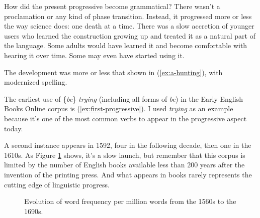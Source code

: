 How did the present progressive become grammatical? There wasn't a proclamation or any kind of phase transition. Instead, it progressed more or less the way science does: one death at a time. There was a slow accretion of younger users who learned the construction growing up and treated it as a natural part of the language. Some adults would have learned it and become comfortable with hearing it over time. Some may even have started using it.

The development was more or less that shown in (\ref{ex:a-hunting}), with modernized spelling.

\ea \label{ex:a-hunting}
 \z
\z

The earliest use of \{\textit{be}\} \textit{trying} (including all forms of \textit{be}) in the Early English Books Online corpus is (\ref{ex:first-progressive}). I used \textit{trying} as an example because it's one of the most common verbs to appear in the progressive aspect today.

\label{ex:first-progressive}
\z

A second instance appears in 1592, four in the following decade, then one in the 1610s. As Figure \ref{fig:be-trying-eebo} shows, it's a slow launch, but remember that this corpus is limited by the number of English books available less than 200 years after the invention of the printing press. And what appears in books rarely represents the cutting edge of linguistic progress.

\begin{figure}[h!]
 \centering
 \caption{Evolution of word frequency per million words from the 1560s to the 1690s.}\label{fig:be-trying-eebo}
\end{figure}

